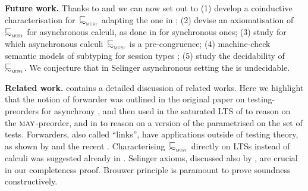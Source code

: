     {\bfseries Future work.}  Thanks to 
    and  we can now set out to
    (1) develop a coinductive characterisation for~$\testleqS$
    adapting the one in
    \cite{DBLP:journals/jacm/AcetoH92,DBLP:journals/mscs/BernardiH16};
    (2) devise an axiomatisation of~$\testleqS$ for asynchronous
    calculi, as done in
    \cite{DBLP:journals/fac/HennessyI93,DBLP:journals/iandc/BorealeN95,DBLP:books/daglib/0066919,DBLP:journals/tcs/Hennessy02}
    for synchronous ones; (3) study for which asynchronous
    calculi~$\testleqS$ is a pre-congruence; (4) machine-check
    semantic models of subtyping for session types \cite{DBLP:journals/mscs/BernardiH16}; (5) study the
    decidability of~$\testleqS$.  We conjecture that in Selinger
    asynchronous setting the \mustpreorder is
    undecidable.%



{\bfseries Related work.}
 contains a detailed discussion of related works.
Here we highlight that the notion of forwarder was outlined in the
original paper on testing-preorders for asynchrony
\cite{DBLP:conf/fsttcs/CastellaniH98}, and then
used in the saturated LTS of \cite{DBLP:conf/birthday/BaldanBGV15}
to reason on the $\operatorname{\textsc{may}}$-preorder, and in \cite{DBLP:phd/us/Thati03}
to reason on a version of the \mustpreorder parametrised on the set of
tests.
Forwarders, also called ``links'', have applications outside of
testing theory, as shown by \cite{DBLP:journals/mscs/MerroS04}
and the recent \cite{DBLP:journals/tcs/DurierHS22}.
Characterising~$\testleqS$ directly on LTSs instead of calculi 
was suggested already in \cite{DBLP:books/daglib/0066919,phdbernardi}.
Selinger axioms, discussed also by \cite{DBLP:journals/mscs/BaldanBGM15}, are
crucial in our completeness proof.
Brouwer \barinduction principle is paramount to prove soundness
constructively.


